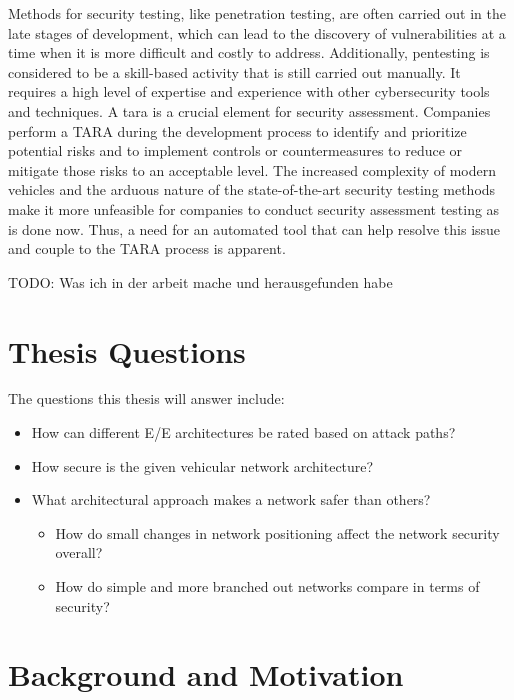 Methods for security testing, like penetration testing, are often carried out in the late stages of development, which can lead to the discovery of vulnerabilities at a time when it is more difficult and costly to address.
Additionally, pentesting is considered to be a skill-based activity that is still carried out manually.
It requires a high level of expertise and experience with other cybersecurity tools and techniques. 
A \gls{tara} is a crucial element for security assessment. 
Companies perform a TARA during the development process to identify and prioritize potential risks and to implement controls or countermeasures to reduce or mitigate those risks to an acceptable level. 
The increased complexity of modern vehicles and the arduous nature of the state-of-the-art security testing methods make it more unfeasible for companies to conduct security assessment testing as is done now. 
Thus, a need for an automated tool that can help resolve this issue and couple to the TARA process is apparent. 

TODO: Was ich in der arbeit mache und herausgefunden habe

\section{Thesis Questions}
\label{sec:thesis-questions}

The questions this thesis will answer include:

\begin{itemize}
    \item How can different E/E architectures be rated based on attack paths?
    \item How secure is the given vehicular network architecture?
    \item What architectural approach makes a network safer than others?
    \begin{itemize}
        \item How do small changes in network positioning affect the network security overall?
        \item How do simple and more branched out networks compare in terms of security?
    \end{itemize}
\end{itemize}



\section{Background and Motivation}
\label{sec:background}

